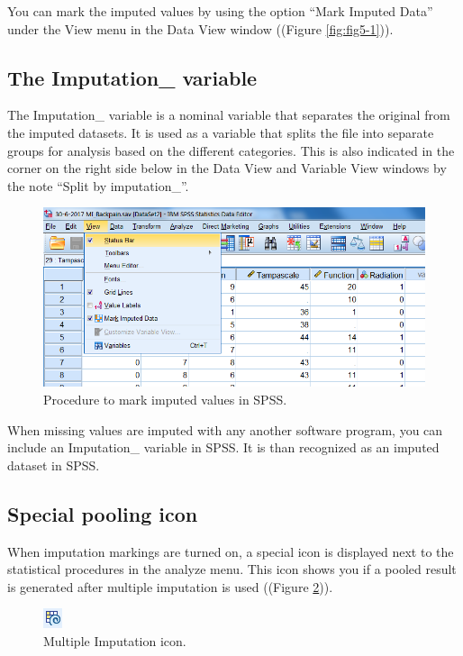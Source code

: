 \documentclass[]{book}
\theoremstyle{definition}
\theoremstyle{definition}
\theoremstyle{definition}
\theoremstyle{remark}
\begin{document}
You can mark the imputed values by using the option ``Mark Imputed
Data'' under the View menu in the Data View window ((Figure
\ref{fig:fig5-1})).

\subsection{The Imputation\_ variable}\label{the-imputation_-variable}

The Imputation\_ variable is a nominal variable that separates the
original from the imputed datasets. It is used as a variable that splits
the file into separate groups for analysis based on the different
categories. This is also indicated in the corner on the right side below
in the Data View and Variable View windows by the note ``Split by
imputation\_''.

\begin{figure}

{\centering \includegraphics[width=0.9\linewidth]{images/fig5.2} 

}

\caption{Procedure to mark imputed values in SPSS.}\label{fig:fig5-2}
\end{figure}

When missing values are imputed with any another software program, you
can include an Imputation\_ variable in SPSS. It is than recognized as
an imputed dataset in SPSS.

\subsection{Special pooling icon}\label{special-pooling-icon}

When imputation markings are turned on, a special icon is displayed next
to the statistical procedures in the analyze menu. This icon shows you
if a pooled result is generated after multiple imputation is used
((Figure \ref{fig:fig5-3})).

\begin{figure}

{\centering \includegraphics[width=0.05\linewidth]{images/fig5.3} 

}

\caption{Multiple Imputation icon.}\label{fig:fig5-3}
\end{figure}
\end{document}
